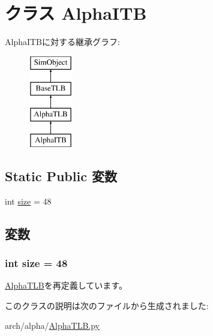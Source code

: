\hypertarget{classAlphaTLB_1_1AlphaITB}{
\section{クラス AlphaITB}
\label{classAlphaTLB_1_1AlphaITB}
}
AlphaITBに対する継承グラフ:\begin{figure}[H]
\begin{center}
\leavevmode
\includegraphics[height=4cm]{classAlphaTLB_1_1AlphaITB}
\end{center}
\end{figure}
\subsection*{Static Public 変数}
\begin{DoxyCompactItemize}
\item 
int \hyperlink{classAlphaTLB_1_1AlphaITB_a439227feff9d7f55384e8780cfc2eb82}{size} = 48
\end{DoxyCompactItemize}


\subsection{変数}
\hypertarget{classAlphaTLB_1_1AlphaITB_a439227feff9d7f55384e8780cfc2eb82}{
\subsubsection[{size}]{\setlength{\rightskip}{0pt plus 5cm}int {\bf size} = 48}}
\label{classAlphaTLB_1_1AlphaITB_a439227feff9d7f55384e8780cfc2eb82}


\hyperlink{classAlphaTLB_1_1AlphaTLB_a377e5da8df1f89c5468c8b8cd07eac89}{AlphaTLB}を再定義しています。

このクラスの説明は次のファイルから生成されました:\begin{DoxyCompactItemize}
\item 
arch/alpha/\hyperlink{AlphaTLB_8py}{AlphaTLB.py}\end{DoxyCompactItemize}

